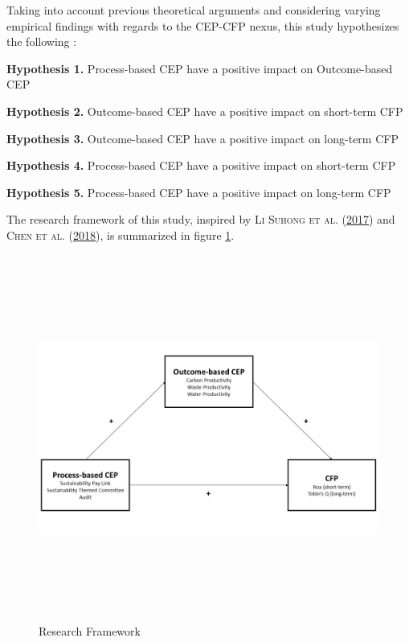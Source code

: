 \documentclass[12pt,]{article}
\begin{document}
Taking into account previous theoretical arguments and considering
varying empirical findings with regards to the CEP-CFP nexus, this study
hypothesizes the following :

\vspace{0.5cm} \textbf{Hypothesis 1.} Process-based CEP have a positive
impact on Outcome-based CEP

\textbf{Hypothesis 2.} Outcome-based CEP have a positive impact on
short-term CFP

\textbf{Hypothesis 3.} Outcome-based CEP have a positive impact on
long-term CFP

\textbf{Hypothesis 4.} Process-based CEP have a positive impact on
short-term CFP

\textbf{Hypothesis 5.} Process-based CEP have a positive impact on
long-term CFP

\vspace{0.5cm}

The research framework of this study, inspired by \textsc{Li Suhong et
al.} (\protect\hyperlink{ref-LiSuhong2017}{2017}) and \textsc{Chen et
al.}
(\protect\hyperlink{ref-Chencrosscountrycomparisongreen2018}{2018}), is
summarized in figure \ref{ResearchFramework}.

\vspace{3cm}

\begin{figure}[!h]
\centering
\includegraphics[width=14cm, height=12cm]{figures/ResearchFramework.jpg}
\caption{Research Framework}
\label{ResearchFramework}
\end{figure}
\end{document}
